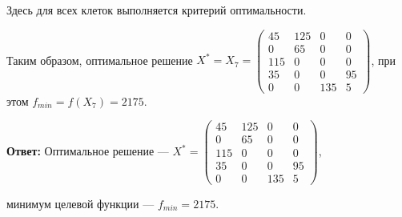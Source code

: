 Здесь для всех клеток выполняется критерий оптимальности.

Таким образом, оптимальное решение $X^* = X_7 = \begin{pmatrix}
        45 & 125 & 0 & 0 \\
        0  & 65  & 0 & 0 \\
        115 & 0 & 0 & 0 \\
        35 & 0 & 0 & 95 \\
        0 & 0 & 135 & 5
\end{pmatrix}$, при этом $f_{min} = f(X_7) = 2175$.

\textbf{Ответ:} Оптимальное решение --- $X^* = \begin{pmatrix}
        45 & 125 & 0 & 0 \\
        0  & 65  & 0 & 0 \\
        115 & 0 & 0 & 0 \\
        35 & 0 & 0 & 95 \\
        0 & 0 & 135 & 5
\end{pmatrix}$, 

минимум целевой функции --- $f_{min} = 2175$. \label{05-lab-answer}
